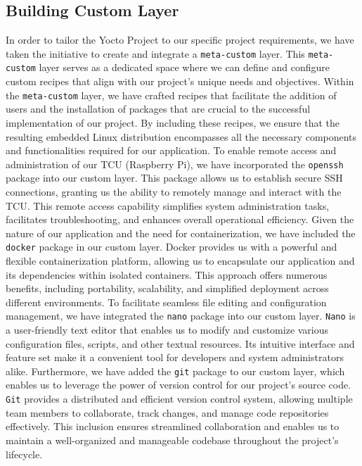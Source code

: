 \documentclass[
12pt,
oneside, 
onehalfspacing, 
nolistspacing, 
parskip, 
chapterinoneline, 
]{AASTCOMPUTER}
\begin{document}
\subsection{Building Custom Layer}
In order to tailor the Yocto Project to our specific project requirements, we have taken the initiative to create and integrate a \texttt{meta-custom} layer. This \texttt{meta-custom} layer serves as a dedicated space where we can define and configure custom recipes that align with our project's unique needs and objectives.
Within the \texttt{meta-custom} layer, we have crafted recipes that facilitate the addition of users and the installation of packages that are crucial to the successful implementation of our project. By including these recipes, we ensure that the resulting embedded Linux distribution encompasses all the necessary components and functionalities required for our application.
To enable remote access and administration of our TCU (Raspberry Pi), we have incorporated the \texttt{openssh} package into our custom layer. This package allows us to establish secure SSH connections, granting us the ability to remotely manage and interact with the TCU. This remote access capability simplifies system administration tasks, facilitates troubleshooting, and enhances overall operational efficiency.
Given the nature of our application and the need for containerization, we have included the \texttt{docker} package in our custom layer. Docker provides us with a powerful and flexible containerization platform, allowing us to encapsulate our application and its dependencies within isolated containers. This approach offers numerous benefits, including portability, scalability, and simplified deployment across different environments.
To facilitate seamless file editing and configuration management, we have integrated the \texttt{nano} package into our custom layer. \texttt{Nano} is a user-friendly text editor that enables us to modify and customize various configuration files, scripts, and other textual resources. Its intuitive interface and feature set make it a convenient tool for developers and system administrators alike.
Furthermore, we have added the \texttt{git} package to our custom layer, which enables us to leverage the power of version control for our project's source code. \texttt{Git} provides a distributed and efficient version control system, allowing multiple team members to collaborate, track changes, and manage code repositories effectively. This inclusion ensures streamlined collaboration and enables us to maintain a well-organized and manageable codebase throughout the project's lifecycle.
\end{document}
